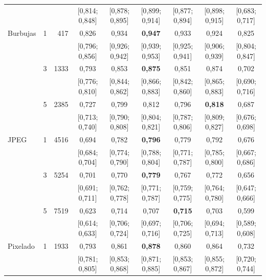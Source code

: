 \begin{table}[tbp]
\begin{tabular}{llrcccccc}
& & & {\tiny [0{,}814; 0{,}848]} & {\tiny [0{,}878; 0{,}895]} & {\tiny [0{,}899; 0{,}914]} & {\tiny [0{,}877; 0{,}894]} & {\tiny [0{,}898; 0{,}915]} & {\tiny [0{,}683; 0{,}717]} \\[1pt]
\addlinespace[2pt]
Burbujas & 1 & \num{417} & 0{,}826 & 0{,}934 & \textbf{0{,}947} & 0{,}933 & 0{,}924 & 0{,}825 \\
& & & {\tiny [0{,}796; 0{,}856]} & {\tiny [0{,}926; 0{,}942]} & {\tiny [0{,}939; 0{,}953]} & {\tiny [0{,}925; 0{,}941]} & {\tiny [0{,}906; 0{,}939]} & {\tiny [0{,}804; 0{,}847]} \\[1pt]
 & 3 & \num{1333} & 0{,}793 & 0{,}853 & \textbf{0{,}875} & 0{,}851 & 0{,}874 & 0{,}702 \\
& & & {\tiny [0{,}776; 0{,}810]} & {\tiny [0{,}844; 0{,}862]} & {\tiny [0{,}866; 0{,}883]} & {\tiny [0{,}842; 0{,}860]} & {\tiny [0{,}865; 0{,}883]} & {\tiny [0{,}690; 0{,}716]} \\[1pt]
 & 5 & \num{2385} & 0{,}727 & 0{,}799 & 0{,}812 & 0{,}796 & \textbf{0{,}818} & 0{,}687 \\
& & & {\tiny [0{,}713; 0{,}740]} & {\tiny [0{,}790; 0{,}808]} & {\tiny [0{,}804; 0{,}821]} & {\tiny [0{,}787; 0{,}806]} & {\tiny [0{,}809; 0{,}827]} & {\tiny [0{,}676; 0{,}698]} \\[1pt]
\addlinespace[2pt]
JPEG & 1 & \num{4516} & 0{,}694 & 0{,}782 & \textbf{0{,}796} & 0{,}779 & 0{,}792 & 0{,}676 \\
& & & {\tiny [0{,}684; 0{,}704]} & {\tiny [0{,}774; 0{,}790]} & {\tiny [0{,}788; 0{,}804]} & {\tiny [0{,}771; 0{,}787]} & {\tiny [0{,}785; 0{,}800]} & {\tiny [0{,}667; 0{,}686]} \\[1pt]
 & 3 & \num{5254} & 0{,}701 & 0{,}770 & \textbf{0{,}779} & 0{,}767 & 0{,}772 & 0{,}656 \\
& & & {\tiny [0{,}691; 0{,}711]} & {\tiny [0{,}762; 0{,}778]} & {\tiny [0{,}771; 0{,}787]} & {\tiny [0{,}759; 0{,}775]} & {\tiny [0{,}764; 0{,}780]} & {\tiny [0{,}647; 0{,}666]} \\[1pt]
 & 5 & \num{7519} & 0{,}623 & 0{,}714 & 0{,}707 & \textbf{0{,}715} & 0{,}703 & 0{,}599 \\
& & & {\tiny [0{,}614; 0{,}633]} & {\tiny [0{,}706; 0{,}724]} & {\tiny [0{,}697; 0{,}716]} & {\tiny [0{,}706; 0{,}725]} & {\tiny [0{,}694; 0{,}713]} & {\tiny [0{,}589; 0{,}608]} \\[1pt]
\addlinespace[2pt]
Pixelado & 1 & \num{1933} & 0{,}793 & 0{,}861 & \textbf{0{,}878} & 0{,}860 & 0{,}864 & 0{,}732 \\
& & & {\tiny [0{,}781; 0{,}805]} & {\tiny [0{,}853; 0{,}868]} & {\tiny [0{,}871; 0{,}885]} & {\tiny [0{,}853; 0{,}867]} & {\tiny [0{,}855; 0{,}872]} & {\tiny [0{,}720; 0{,}744]} \\[1pt]

\end{tabular}
\end{table}
